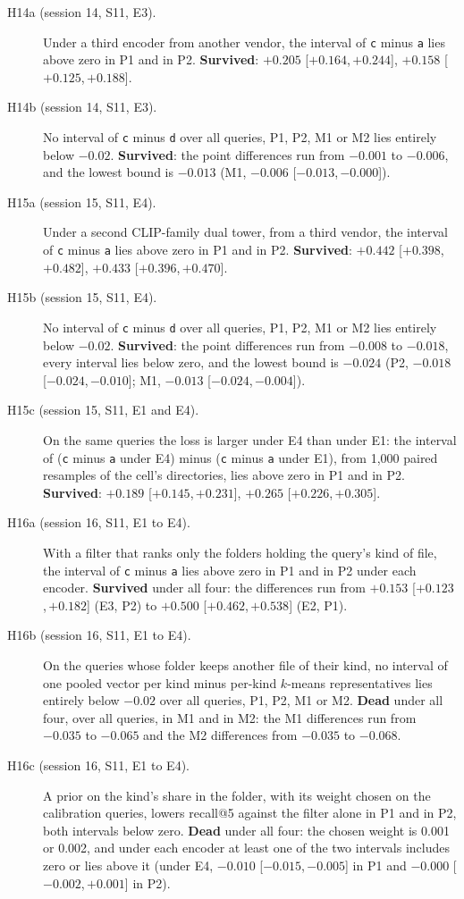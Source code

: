 \documentclass[11pt]{article}
\newcommand{\rep}[1]{\texttt{#1}}
\newcommand{\ci}[2]{[\ensuremath{#1},\,\ensuremath{#2}]}  %
\begin{document}
\begin{description}
\item[H14a (session 14, S11, E3).] Under a third encoder from another vendor, the interval of \rep{c} minus \rep{a} lies above zero in P1 and in P2. \textbf{Survived}: $+0.205$ \ci{+0.164}{+0.244}, $+0.158$ \ci{+0.125}{+0.188}.
\item[H14b (session 14, S11, E3).] No interval of \rep{c} minus \rep{d} over all queries, P1, P2, M1 or M2 lies entirely below $-0.02$. \textbf{Survived}: the point differences run from $-0.001$ to $-0.006$, and the lowest bound is $-0.013$ (M1, $-0.006$ \ci{-0.013}{-0.000}).
\item[H15a (session 15, S11, E4).] Under a second CLIP-family dual tower, from a third vendor, the interval of \rep{c} minus \rep{a} lies above zero in P1 and in P2. \textbf{Survived}: $+0.442$ \ci{+0.398}{+0.482}, $+0.433$ \ci{+0.396}{+0.470}.
\item[H15b (session 15, S11, E4).] No interval of \rep{c} minus \rep{d} over all queries, P1, P2, M1 or M2 lies entirely below $-0.02$. \textbf{Survived}: the point differences run from $-0.008$ to $-0.018$, every interval lies below zero, and the lowest bound is $-0.024$ (P2, $-0.018$ \ci{-0.024}{-0.010}; M1, $-0.013$ \ci{-0.024}{-0.004}).
\item[H15c (session 15, S11, E1 and E4).] On the same queries the loss is larger under E4 than under E1: the interval of (\rep{c} minus \rep{a} under E4) minus (\rep{c} minus \rep{a} under E1), from 1,000 paired resamples of the cell's directories, lies above zero in P1 and in P2. \textbf{Survived}: $+0.189$ \ci{+0.145}{+0.231}, $+0.265$ \ci{+0.226}{+0.305}.
\item[H16a (session 16, S11, E1 to E4).] With a filter that ranks only the folders holding the query's kind of file, the interval of \rep{c} minus \rep{a} lies above zero in P1 and in P2 under each encoder. \textbf{Survived} under all four: the differences run from $+0.153$ \ci{+0.123}{+0.182} (E3, P2) to $+0.500$ \ci{+0.462}{+0.538} (E2, P1).
\item[H16b (session 16, S11, E1 to E4).] On the queries whose folder keeps another file of their kind, no interval of one pooled vector per kind minus per-kind $k$-means representatives lies entirely below $-0.02$ over all queries, P1, P2, M1 or M2. \textbf{Dead} under all four, over all queries, in M1 and in M2: the M1 differences run from $-0.035$ to $-0.065$ and the M2 differences from $-0.035$ to $-0.068$.
\item[H16c (session 16, S11, E1 to E4).] A prior on the kind's share in the folder, with its weight chosen on the calibration queries, lowers recall@5 against the filter alone in P1 and in P2, both intervals below zero. \textbf{Dead} under all four: the chosen weight is 0.001 or 0.002, and under each encoder at least one of the two intervals includes zero or lies above it (under E4, $-0.010$ \ci{-0.015}{-0.005} in P1 and $-0.000$ \ci{-0.002}{+0.001} in P2).

\end{description}
\end{document}
